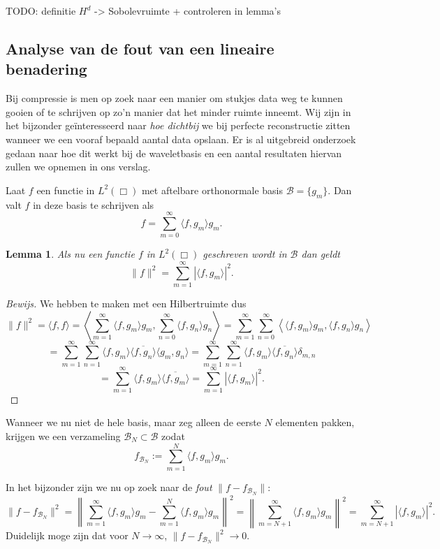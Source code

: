\documentclass[11pt]{report}
\theoremstyle{plain}
\newtheorem*{lemm}{Lemma}
\theoremstyle{remark}
\begin{document}
TODO: definitie $H^d$ -> Sobolevruimte + controleren in lemma's

\subsection{Analyse van de fout van een lineaire benadering}
Bij compressie is men op zoek naar een manier om stukjes data weg te kunnen gooien of te schrijven op zo'n manier dat het minder ruimte inneemt. Wij zijn in het bijzonder ge\"interesseerd naar \emph{hoe dichtbij} we bij perfecte reconstructie zitten wanneer we een vooraf bepaald aantal data opslaan. Er is al uitgebreid onderzoek gedaan naar hoe dit werkt bij de waveletbasis en een aantal resultaten hiervan zullen we opnemen in ons verslag.

Laat $f$ een functie in $L^2(\Box)$ met aftelbare orthonormale basis $\mathcal{B} = \{ g_m \}$. Dan valt $f$ in deze basis te schrijven als
\[
	f = \sum_{m = 0}^\infty \langle f, g_m \rangle g_m.
\]

\begin{lemm}
Als nu een functie $f$ in $L^2(\Box)$ geschreven wordt in $\mathcal{B}$ dan geldt
\[
	\|f\|^2 = \sum_{m=1}^\infty | \langle f, g_m \rangle |^2.
\]
\end{lemm}
\begin{proof}[Bewijs]
We hebben te maken met een Hilbertruimte dus
\[
\|f\|^2 = \langle f, f \rangle = \left\langle \sum_{m=1}^\infty \langle f, g_m \rangle g_m, \sum_{n=0}^\infty \langle f, g_n \rangle g_n \right\rangle = \sum_{m=1}^\infty \sum_{n=0}^\infty \left\langle \langle f, g_m \rangle g_m, \langle f, g_n \rangle g_n \right \rangle
\]
\[
 = \sum_{m=1}^\infty \sum_{n=1}^\infty \langle f, g_m \rangle \overline{\langle f, g_n \rangle}\langle g_m, g_n \rangle = \sum_{m=1}^\infty \sum_{n=1}^\infty \langle f, g_m \rangle \overline{\langle f, g_n \rangle} \delta_{m,n} 
\]
\[ = \sum_{m=1}^\infty \langle f, g_m \rangle \overline{\langle f, g_m \rangle} = \sum_{m=1}^\infty |\langle f, g_m \rangle |^2.
\]
\end{proof}

Wanneer we nu niet de hele basis, maar zeg alleen de eerste $N$ elementen pakken, krijgen we een verzameling $\mathcal{B}_N \subset \mathcal{B}$ zodat
\[
	f_{\mathcal{B}_N} := \sum_{m = 1}^N \langle f, g_m \rangle g_m.
\]

In het bijzonder zijn we nu op zoek naar de \emph{fout} $\| f - f_{\mathcal{B}_N} \|$:
\[
	\| f - f_{\mathcal{B}_N} \|^2 = \left\| \sum_{m=1}^\infty\langle f, g_m \rangle g_m - \sum_{m=1}^N \langle f, g_m \rangle g_m \right\|^2 = \left\| \sum_{m=N+1}^\infty\langle f, g_m \rangle g_m \right\|^2 = \sum_{m=N+1}^\infty | \langle f, g_m \rangle |^2.
\]
Duidelijk moge zijn dat voor $N \to \infty$, $\| f - f_{\mathcal{B}_N} \|^2 \to 0$.
\end{document}
